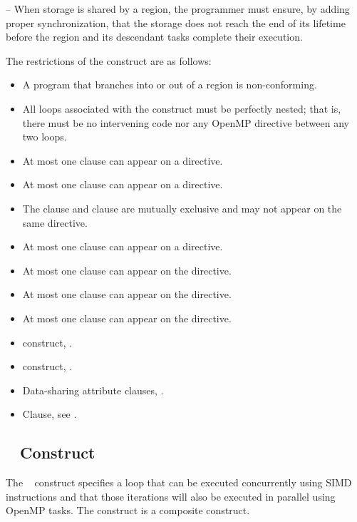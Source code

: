 \notestart
\noteheader – When storage is shared by a  region, the programmer must ensure, by adding proper synchronization, that the storage does not reach the end of its lifetime before the  region and its descendant tasks complete their execution.
\noteend

\restrictions
The restrictions of the  construct are as follows:
\begin{itemize}
\item A program that branches into or out of a  region is non-conforming.
\item All loops associated with the  construct must be perfectly nested; that is, there must be no intervening code nor any OpenMP directive between any two loops.
\item At most one  clause can appear on a  directive.
\item At most one  clause can appear on a  directive.
\item The  clause and  clause are mutually exclusive and may not appear on the same  directive.
\item At most one  clause can appear on a  directive.
\item At most one  clause can appear on the directive.
\item At most one  clause can appear on the directive. 
\item At most one  clause can appear on the directive.
\end{itemize}

\crossreferences
\begin{itemize}
\item {} construct, .
\item {} construct, .
\item Data-sharing attribute clauses, . 
\item {} Clause, see .
\end{itemize}






%
%
\subsection{~ Construct}
\label{subsec:taskloop simd Construct}
\summary
The ~ construct specifies a loop that can be 
executed concurrently using SIMD instructions and that those iterations 
will also be executed in parallel using OpenMP tasks. The 
 construct is a composite construct.

